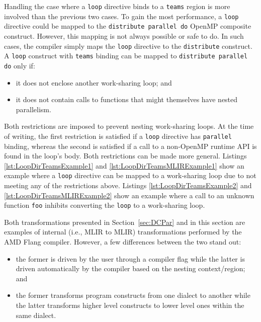 \documentclass[acmtog,natbib=false]{acmart}
\newcommand{\code}[1]{\texttt{#1}\xspace}
\begin{document}
Handling the case where a \code{loop} directive binds to a \code{teams} region is more involved than the previous two cases.
To gain the most performance, a \code{loop} directive could be mapped to the \code{distribute parallel do} OpenMP composite construct.
However, this mapping is not always possible or safe to do.
In such cases, the compiler simply maps the \code{loop} directive to the \code{distribute} construct.
A \code{loop} construct with \code{teams} binding can be mapped to \code{distribute parallel do} only if:
\begin{itemize}
    \item it does not enclose another work-sharing loop; and
    \item it does not contain calls to functions that might themselves have nested parallelism.
\end{itemize}
Both restrictions are imposed to prevent nesting work-sharing loops.
At the time of writing, the first restriction is satisfied if a \code{loop} directive has \code{parallel} binding, whereas the second is satisfied if a call to a non-OpenMP runtime API is found in the loop's body.
Both restrictions can be made more general.
Listings \ref{lst:LoopDirTeamsExample1} and \ref{lst:LoopDirTeamsMLIRExample1} show an example where a \code{loop} directive can be mapped to a work-sharing loop due to not meeting any of the restrictions above.
Listings \ref{lst:LoopDirTeamsExample2} and \ref{lst:LoopDirTeamsMLIRExample2} show an example where a call to an unknown function \code{foo} inhibits converting the \code{loop} to a work-sharing loop.

Both transformations presented in Section~\ref{sec:DCPar} and in this section are examples of internal (i.e., \ac{MLIR} to \ac{MLIR}) transformations performed by the AMD Flang compiler. However, a few differences between the two stand out:
\begin{itemize}
    \item the former is driven by the user through a compiler flag while the latter is driven automatically by the compiler based on the nesting context/region; and
    \item the former transforms program constructs from one dialect to another while the latter transforms higher level constructs to lower level ones within the same dialect.
\end{itemize}
\end{document}
